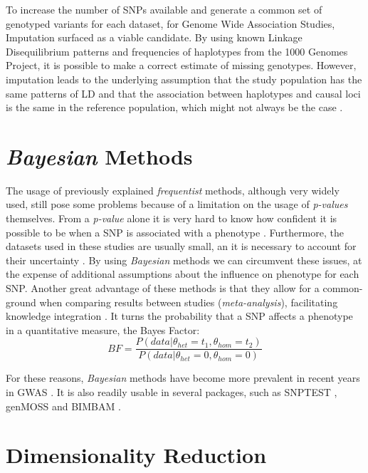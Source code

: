 To increase the number of \gls{SNP}s available and generate a common set of genotyped variants for each dataset, for Genome Wide Association Studies, Imputation surfaced as a viable candidate. By using known Linkage Disequilibrium patterns and frequencies of haplotypes from the 1000 Genomes Project, it is possible to make a correct estimate of missing genotypes. However, imputation leads to the underlying assumption that the study population has the same patterns of \gls{LD} and that the association between haplotypes and causal loci is the same in the reference population, which might not always be the case \cite{10002012integrated, bush2012genome}.

\section{\textit{Bayesian} Methods}

The usage of previously explained \textit{frequentist} methods, although very widely used, still pose some problems because of a limitation on the usage of \textit{p-values} themselves. From a \textit{p-value} alone it is very hard to know how confident it is possible to be when a \gls{SNP} is associated with a phenotype \cite{ioannidis2008effect}. Furthermore, the datasets used in these studies are usually small, an it is necessary to account for their uncertainty \cite{o2008bayesian}. By using \textit{Bayesian} methods we can circumvent these issues, at the expense of additional assumptions about the influence on phenotype for each \gls{SNP}. Another great advantage of these methods is that they allow for a common-ground when comparing results between studies (\textit{meta-analysis}), facilitating knowledge integration \cite{stephens2009bayesian}. It turns the probability that a \gls{SNP} affects a phenotype in a quantitative measure, the Bayes Factor:
\begin{equation}
	BF = \frac{P(data | \theta_{het} = t_1, \theta_{hom} = t_2)}{P(data | \theta_{het} = 0, \theta_{hom} = 0)}
\end{equation}

For these reasons, \textit{Bayesian} methods have become more prevalent in recent years in GWAS \cite{fernando2017application}. It is also readily usable in several packages, such as SNPTEST \cite{marchini2007new}, genMOSS \cite{friedlander2016analyzing} and BIMBAM \cite{guan2008practical}.

\section{Dimensionality Reduction}

